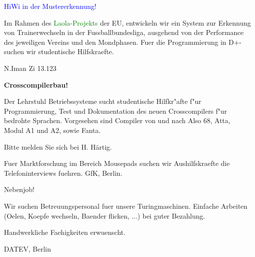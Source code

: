 \documentclass[a4paper, 12pt]{article}
\begin{document}
\vskip 5cm

  { \helv
  { \center \helvboldbig 

  \textcolor{blue}{HiWi in der Mustererkennung!}

  } \bigskip

  Im Rahmen des { \textcolor{green}{Laola-Projekts}} der EU, entwickeln wir ein System 
  zur Erkennung von Trainerwechseln in der Fussballbundesliga,
  ausgehend von der Performance des jeweiligen Vereins und den
  Mondphasen. Fuer die Programmierung in D+- suchen wir studentische
  Hilfskraefte.                
        
  \hfill                                   N.Iman Zi 13.123

  }

\vskip 5cm

  { \large

  { \bf  Crosscompilerbau! }

  \medskip

  Der Lehrstuhl Betriebssysteme sucht studentische Hilfkr"afte f"ur 
  Programmierung, Test und Dokumentation des neuen Crosscompilers f"ur 
  bedrohte Sprachen. Vorgesehen sind Compiler von und nach Also 68, Atta, 
  Modul A1 und A2, sowie Fanta.

  \smallskip 
 
  Bitte melden Sie sich bei H. H\"artig.

  }

\vskip 5cm

  { \helv

  Fuer Marktforschung im Bereich Mousepads suchen wir Aushilfskraefte
  die Telefoninterviews fuehren. GfK, Berlin.

  }

\vskip 5cm

  { \avantg \baselineskip 17pt
  { \avantgbig \center

  Nebenjob!

  }

  \medskip

  Wir suchen Betreuungspersonal fuer unsere Turingmaschinen. 
  Einfache Arbeiten (Oelen, Koepfe wechseln, Baender flicken, ...) 
  bei guter Bezahlung.

  \smallskip

  Handwerkliche Faehigkeiten erwuenscht.

  \smallskip

  \hfill  DATEV, Berlin


  }

\vskip 5cm
\end{document}
